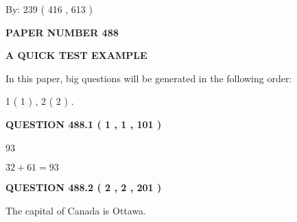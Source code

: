 \documentclass[12pt]{article}
\begin{document}
   
\hspace{1.0in} By: 
 239 ( 416 ,  613 )
   
   
   
   
\newpage 
\setcounter{page}{ 
   488001 } 
   
   
   
   
 {\textbf{ \Large{ PAPER NUMBER  488  }}}
   
   
\vspace{0.2in}
   
   
   
   
   
   
 \vspace{0.2in}
{\LARGE {\textbf{ A QUICK TEST EXAMPLE}}}
   
   
   
\vspace{0.2in}
   
In this paper, big questions will be generated in the following order: 
   
   
   1 ( 1 )
 ,
   2 ( 2 )
 .
  
\vspace{0.2in}
  
{\textbf{\Large{QUESTION
488.1 
 ( 1 , 1 , 101 )
}}}
  
  
 
 
\noindent{}

93
 
 
 
 
\noindent{}

$ %
32 +  %
61=   %
93$
 
 
  
\vspace{0.2in}
  
{\textbf{\Large{QUESTION
488.2 
 ( 2 , 2 , 201 )
}}}
  
  
 
 
\noindent{}
 
 
The capital of Canada is Ottawa.
 
 
 
 
   
   
 \vspace{0.2in}
 
\end{document}

